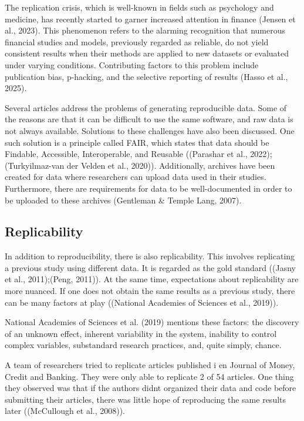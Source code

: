 \documentclass[
  a4paper,
]{article}
\begin{document}
The replication crisis, which is well-known in fields such as psychology
and medicine, has recently started to garner increased attention in
finance (Jensen et al., 2023). This phenomenon refers to the alarming
recognition that numerous financial studies and models, previously
regarded as reliable, do not yield consistent results when their methods
are applied to new datasets or evaluated under varying conditions.
Contributing factors to this problem include publication bias,
p-hacking, and the selective reporting of results (Hasso et al., 2025).

Several articles address the problems of generating reproducible data.
Some of the reasons are that it can be difficult to use the same
software, and raw data is not always available. Solutions to these
challenges have also been discussed. One such solution is a principle
called FAIR, which states that data should be Findable, Accessible,
Interoperable, and Reusable ((Parashar et al., 2022);(Turkyilmaz-van der
Velden et al., 2020)). Additionally, archives have been created for data
where researchers can upload data used in their studies. Furthermore,
there are requirements for data to be well-documented in order to be
uploaded to these archives (Gentleman \& Temple Lang, 2007).

\subsection{Replicability}\label{replicability}

In addition to reproducibility, there is also replicability. This
involves replicating a previous study using different data. It is
regarded as the gold standard ((Jasny et al., 2011);(Peng, 2011)). At
the same time, expectations about replicability are more nuanced. If one
does not obtain the same results as a previous study, there can be many
factors at play ((National Academies of Sciences et al., 2019)).

National Academies of Sciences et al. (2019) mentions these factors: the
discovery of an unknown effect, inherent variability in the system,
inability to control complex variables, substandard research practices,
and, quite simply, chance.

A team of researchers tried to replicate articles published i en Journal
of Money, Credit and Banking. They were only able to replicate 2 of 54
articles. One thing they observed was that if the authors didnt
organized their data and code before submitting their articles, there
was little hope of reproducing the same results later ((McCullough et
al., 2008)).
\end{document}
